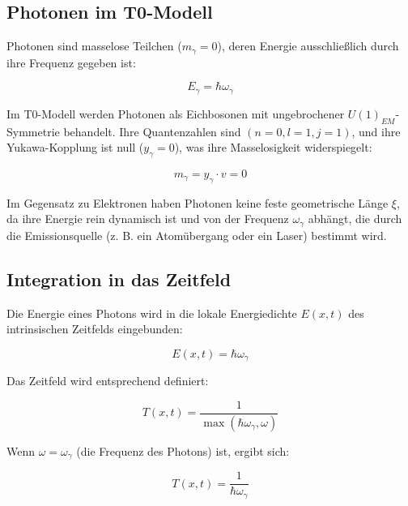 \documentclass[12pt,a4paper]{article}
\begin{document}
	\subsection{Photonen im T0-Modell}
	\label{subsec:photon_model}
	
	Photonen sind masselose Teilchen (\( m_\gamma = 0 \)), deren Energie ausschließlich durch ihre Frequenz gegeben ist:
	
	\begin{equation}
		E_\gamma = \hbar \omega_\gamma
	\end{equation}
	
	Im T0-Modell werden Photonen als Eichbosonen mit ungebrochener \( U(1)_{EM} \)-Symmetrie behandelt. Ihre Quantenzahlen sind \((n=0, l=1, j=1)\), und ihre Yukawa-Kopplung ist null (\( y_\gamma = 0 \)), was ihre Masselosigkeit widerspiegelt:
	
	\begin{equation}
		m_\gamma = y_\gamma \cdot v = 0
	\end{equation}
	
	Im Gegensatz zu Elektronen haben Photonen keine feste geometrische Länge \(\xi\), da ihre Energie rein dynamisch ist und von der Frequenz \(\omega_\gamma\) abhängt, die durch die Emissionsquelle (z. B. ein Atomübergang oder ein Laser) bestimmt wird.
	
	\subsection{Integration in das Zeitfeld}
	\label{subsec:photon_time_field}
	
	Die Energie eines Photons wird in die lokale Energiedichte \( E(x,t) \) des intrinsischen Zeitfelds eingebunden:
	
	\begin{equation}
		E(x,t) = \hbar \omega_\gamma
	\end{equation}
	
	Das Zeitfeld wird entsprechend definiert:
	
	\begin{equation}
		T(x,t) = \frac{1}{\max(\hbar \omega_\gamma, \omega)}
	\end{equation}
	
	Wenn \(\omega = \omega_\gamma\) (die Frequenz des Photons) ist, ergibt sich:
	
	\begin{equation}
		T(x,t) = \frac{1}{\hbar \omega_\gamma}
	\end{equation}
	
\end{document}
